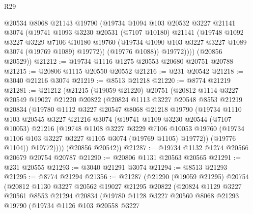 \begin{lexlean}{R29}
\begin{coremodule}
            @20534
            @8068
            @21143
            @19790
            (@19734
              @1094
              @103
              @20532
              @3227
              @21141
              @3074
              (@19741
                @1093
                @3230
                @20531
                (@7107 @10180)
                @21141
                (@19748
                  @1092
                  @3227
                  @3229
                  @7106
                  @10180
                  @19760
                  (@19734 @1090 @103 @3227 @3227 @1089 @3074 (@19769 @1089) @19772))
                (@19776 @1088))
              @19772))))
      (@20856 @20529))
@21212 := @19734 @1116 @1275 @20553 @20680 @20751 @20788
@21215 := @20806 @1115 @20550 @20552
@21216 := @231 @20542
@21218 := @3040 @21216 @3074
@21219 := @8513 @21218
@21220 := @8774 @21219
@21281 := @21212
    (@21215
      (@19059 @21220)
      @20751
      (@20812
        @1114
        @3227
        @20549
        @19027
        @21220
        @20822
        (@20824
          @1113
          @3227
          @20548
          @8553
          @21219
          @20834
          (@19780
            @1112
            @3227
            @20547
            @8068
            @21218
            @19790
            (@19734
              @1110
              @103
              @20545
              @3227
              @21216
              @3074
              (@19741
                @1109
                @3230
                @20544
                (@7107 @10053)
                @21216
                (@19748
                  @1108
                  @3227
                  @3229
                  @7106
                  @10053
                  @19760
                  (@19734 @1106 @103 @3227 @3227 @1105 @3074 (@19769 @1105) @19772))
                (@19776 @1104))
              @19772))))
      (@20856 @20542))
@21287 := @19734 @1132 @1274 @20566 @20679 @20754 @20787
@21290 := @20806 @1131 @20563 @20565
@21291 := @231 @20555
@21293 := @3040 @21291 @3074
@21294 := @8513 @21293
@21295 := @8774 @21294
@21356 := @21287
    (@21290
      (@19059 @21295)
      @20754
      (@20812
        @1130
        @3227
        @20562
        @19027
        @21295
        @20822
        (@20824
          @1129
          @3227
          @20561
          @8553
          @21294
          @20834
          (@19780
            @1128
            @3227
            @20560
            @8068
            @21293
            @19790
            (@19734
              @1126
              @103
              @20558
              @3227

\end{coremodule}
\end{lexlean}
